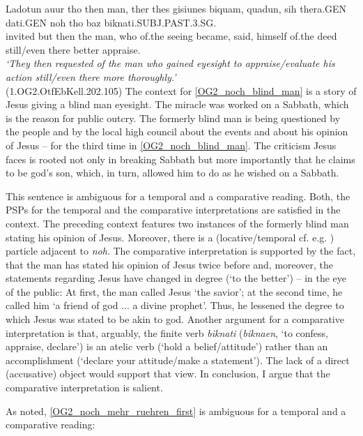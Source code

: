 \documentclass[output=paper,
modfonts
]{langscibook}
\begin{document}
\ea\gll Ladotun auur tho then man, ther thes gisiunes biquam, quadun, sih thera.GEN dati.GEN noh tho baz biknati.SUBJ.PAST.3.SG.\\
       invited but then the man, who of.the seeing became, said, himself of.the deed still/even there better appraise.\\
\glt   \textit{`They then requested of the man who gained eyesight to appraise/evaluate his action still/even there more thoroughly.'}\label{OG2_noch_blind_man} \\ \flushright \vspace{-24pt} (1.OG2.OtfEbKell.202.105)
\z
The context for \ref{OG2_noch_blind_man} is a story of Jesus giving a blind man eyesight. The miracle was worked on a Sabbath, which is the reason for public outcry. The formerly blind man is being questioned by the people and by the local high council about the events and about his opinion of Jesus -- for the third time in \ref{OG2_noch_blind_man}. The criticism Jesus faces is rooted not only in breaking Sabbath but more importantly that he claims to be god's son, which, in turn, allowed him to do as he wished on a Sabbath.

This sentence is ambiguous for a temporal and a comparative reading. Both, the PSPs for the temporal and the comparative interpretations are satisfied in the context. The preceding context features two instances of the formerly blind man stating his opinion of Jesus. Moreover, there is a (locative/temporal cf. e.g. \citep{petrova2011}) particle adjacent to \textit{noh}. The comparative interpretation is supported by the fact, that the man has stated his opinion of Jesus twice before and, moreover, the statements regarding Jesus have changed in degree (`to the better') -- in the eye of the public: At first, the man called Jesus `the savior'; at the second time, he called him `a friend of god ... a divine prophet'. Thus, he lessened the degree to which Jesus was stated to be akin to god. Another argument for a comparative interpretation is that, arguably, the finite verb \textit{biknati} (\textit{biknaen}, `to confess, appraise, declare') is an atelic verb (`hold a belief/attitude') rather than an accomplishment (`declare your attitude/make a statement'). The lack of a direct (accusative) object would support that view. In conclusion, I argue that the comparative interpretation is salient.

As noted, \ref{OG2_noch_mehr_ruehren_first} is ambiguous for a temporal and a comparative reading:
\end{document}
